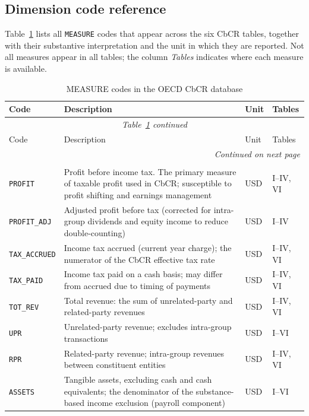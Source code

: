 \documentclass[11pt,a4paper]{article}
\newcommand{\code}[1]{\texttt{#1}}
\begin{document}
\subsection{Dimension code reference}\label{sec:dimensions}

Table~\ref{tab:measures} lists all \code{MEASURE} codes that appear across the six CbCR tables, together with their substantive interpretation and the unit in which they are reported. Not all measures appear in all tables; the column \emph{Tables} indicates where each measure is available.

\begin{longtable}{@{}lp{6cm}lp{2.5cm}@{}}
\caption{MEASURE codes in the OECD CbCR database}\label{tab:measures}\\
\toprule
Code & Description & Unit & Tables \\
\midrule
\endfirsthead
\multicolumn{4}{c}{\textit{Table~\ref{tab:measures} continued}}\\
\toprule
Code & Description & Unit & Tables \\
\midrule
\endhead
\midrule
\multicolumn{4}{r}{\textit{Continued on next page}}\\
\endfoot
\bottomrule
\endlastfoot
\multicolumn{4}{l}{\textit{Financial aggregates}}\\
\code{PROFIT} & Profit before income tax. The primary measure of taxable profit used in CbCR; susceptible to profit shifting and earnings management & USD & I--IV, VI \\
\code{PROFIT\_ADJ} & Adjusted profit before tax (corrected for intra-group dividends and equity income to reduce double-counting) & USD & I--IV \\
\code{TAX\_ACCRUED} & Income tax accrued (current year charge); the numerator of the CbCR effective tax rate & USD & I--IV, VI \\
\code{TAX\_PAID}  & Income tax paid on a cash basis; may differ from accrued due to timing of payments & USD & I--IV, VI \\
\code{TOT\_REV}  & Total revenue: the sum of unrelated-party and related-party revenues & USD & I--IV, VI \\
\code{UPR}   & Unrelated-party revenue; excludes intra-group transactions & USD & I--VI \\
\code{RPR}   & Related-party revenue; intra-group revenues between constituent entities & USD & I--IV, VI \\
\code{ASSETS}   & Tangible assets, excluding cash and cash equivalents; the denominator of the substance-based income exclusion (payroll component) & USD & I--VI \\

\end{longtable}
\end{document}
